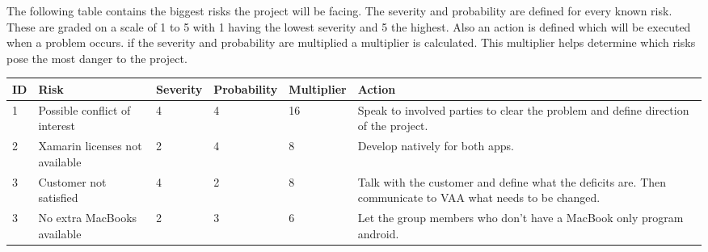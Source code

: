 The following table contains the biggest risks the project will be facing. The severity and probability are defined for every known risk. These are graded on a scale of 1 to 5 with 1 having the lowest severity and 5 the highest. Also an action is defined which will be executed when a problem occurs. if the severity and probability are multiplied a multiplier is calculated. This multiplier helps determine which risks pose the most danger to the project.

\begin{tabular}{| p{} | p{3cm} | p{} | p{2cm} | p{} | p{4cm} |}
	\hline
	ID & Risk & Severity & Probability & Multiplier & Action \\
	\hline
	1 & Possible conflict of interest  & 4 & 4 & 16 & Speak to involved parties to clear the problem and define direction of the project. \\
	\hline
	2 & Xamarin licenses not available & 2 & 4 & 8 & Develop natively for both apps. \\
	\hline
	3 & Customer not satisfied  & 4 & 2 & 8 & Talk with the customer and define what the deficits are. Then communicate to VAA what needs to be changed.\\
	\hline
	3 & No extra MacBooks available  & 2 & 3 & 6 & Let the group members who don't have a MacBook only program android. \\
	\hline
	
\end{tabular}